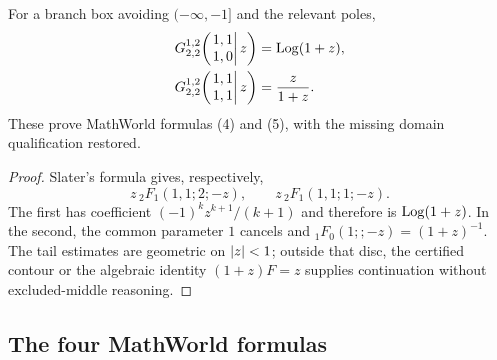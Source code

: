\begin{theorem}\label{thm:log-rational}
For a branch box avoiding $(-\infty,-1]$ and the relevant poles,
\begin{align}
 G_{2,2}^{1,2}\!\left(
  \left.\begin{matrix}1,1\\1,0\end{matrix}\right|z\right)
 &=\operatorname{Log}(1+z),
 \label{eq:log-g}\\
 G_{2,2}^{1,2}\!\left(
  \left.\begin{matrix}1,1\\1,1\end{matrix}\right|z\right)
 &=\frac{z}{1+z}.
 \label{eq:rational-g}
\end{align}
These prove MathWorld formulas (4) and (5), with the missing domain
qualification restored.
\end{theorem}
\begin{proof}
Slater's formula gives, respectively,
\[
 z\,{}_2F_1(1,1;2;-z),
 \qquad z\,{}_2F_1(1,1;1;-z).
\]
The first has coefficient $(-1)^kz^{k+1}/(k+1)$ and therefore is
$\operatorname{Log}(1+z)$.  In the second, the common parameter $1$ cancels and
${}_1F_0(1;;-z)=(1+z)^{-1}$.  The tail estimates are geometric on
$\left|z\right|<1$; outside that disc, the certified contour or the algebraic identity
$(1+z)F=z$ supplies continuation without excluded-middle reasoning.
\end{proof}

\subsection{The four MathWorld formulas}

